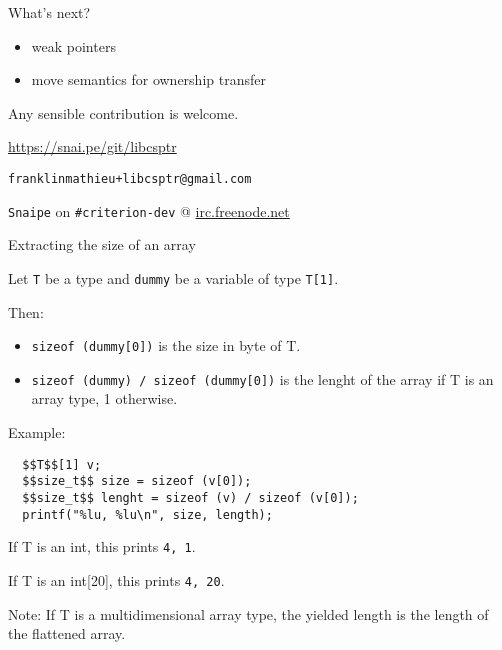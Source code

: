 \documentclass[10pt]{beamer}
\begin{document}

\begin{frame}[fragile]{What's next?}
  \begin{itemize}
    \item weak pointers
    \item move semantics for ownership transfer
  \end{itemize}

  \begin{center}
    Any sensible contribution is welcome.

    \large \faGithub \normalsize\hspace{0.7em}
    \url{https://snai.pe/git/libcsptr}

    \large \faEnvelope \normalsize\hspace{0.7em}
    \verb|franklinmathieu+libcsptr@gmail.com|

    \verb|Snaipe| on \verb|#criterion-dev| @ \url{irc.freenode.net}

  \end{center}
\end{frame}



\begin{frame}[fragile]{Extracting the size of an array}

  Let \verb|T| be a type and \verb|dummy| be a variable of type \verb|T[1]|.

  Then:

  \begin{itemize}
    \item \verb|sizeof (dummy[0])| is the size in byte of T.
    \item \verb|sizeof (dummy) / sizeof (dummy[0])| is the lenght of the array if T is an array type, 1 otherwise.
  \end{itemize}

  Example:
  \begin{lstlisting}
  $$T$$[1] v;
  $$size_t$$ size = sizeof (v[0]);
  $$size_t$$ lenght = sizeof (v) / sizeof (v[0]);
  printf("%lu, %lu\n", size, length);
  \end{lstlisting}

  If T is an int, this prints \verb|4, 1|.

  If T is an int[20], this prints \verb|4, 20|.

  Note: If T is a multidimensional array type, the yielded length is the length of the flattened array.

\end{frame}
\end{document}
